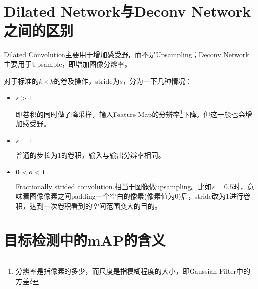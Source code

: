 \section{Dilated Network与Deconv Network之间的区别}
Dilated Convolution主要用于增加感受野，而不是Upsampling；Deconv Network主要用于Upsample，即增加图像分辨率。

对于标准的$k \times k$的卷及操作，stride为$s$，分为一下几种情况：
\begin{itemize}
\item $s > 1$

即卷积的同时做了降采样，输入Feature Map的分辨率\footnote{分辨率是指像素的多少，而尺度是指模糊程度的大小，即Gaussian Filter中的方差$\delta$}下降。但这一般也会增加感受野。

\item $s = 1$

普通的步长为1的卷积，输入与输出分辨率相同。

\item $\mathbf{0 < s < 1}$

Fractionally strided convolution.相当于图像做upsampling。比如$s=0.5$时，意味着图像像素之间padding一个空白的像素(像素值为0)后，stride改为1进行卷积，达到一次卷积看到的空间范围变大的目的。

\end{itemize}

\section{目标检测中的mAP的含义}

